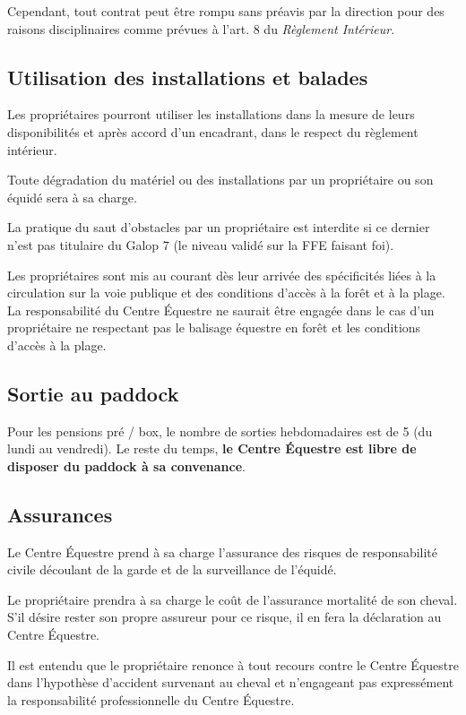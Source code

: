 \documentclass[11pt,a4paper]{article}
\begin{document}
Cependant, tout contrat peut être rompu sans préavis par la direction pour des raisons disciplinaires comme prévues à l'art. 8 du \textit{Règlement Intérieur}.

\subsection*{Utilisation des installations et balades}
Les propriétaires pourront utiliser les installations dans la mesure de leurs disponibilités et après accord d'un encadrant, dans le respect du règlement intérieur.

Toute dégradation du matériel ou des installations par un propriétaire ou son équidé sera à sa charge.

La pratique du saut d'obstacles par un propriétaire est interdite si ce dernier n'est pas titulaire du Galop 7 (le niveau validé sur la FFE faisant foi).

Les propriétaires sont mis au courant dès leur arrivée des spécificités liées à la circulation sur la voie publique et des conditions d'accès à la forêt et à la plage. La responsabilité du Centre Équestre ne saurait être engagée dans le cas d'un propriétaire ne respectant pas le balisage équestre en forêt et les conditions d'accès à la plage.

\subsection*{Sortie au paddock}
Pour les pensions pré / box, le nombre  de sorties hebdomadaires est de 5 (du lundi au vendredi). Le reste du temps, \textbf{le Centre Équestre est libre de disposer du paddock à sa convenance}.

\subsection*{Assurances}
Le Centre Équestre prend à sa charge l'assurance des risques de responsabilité civile découlant de la garde et de la surveillance de l'équidé.

Le propriétaire prendra à sa charge le coût de l'assurance mortalité de son cheval. S'il désire rester son propre assureur pour ce risque, il en fera la déclaration au Centre Équestre.

Il est entendu que le propriétaire renonce à tout recours contre le Centre Équestre dans l'hypothèse d'accident survenant au cheval et n'engageant pas expressément la responsabilité professionnelle du Centre Équestre.
\end{document}
